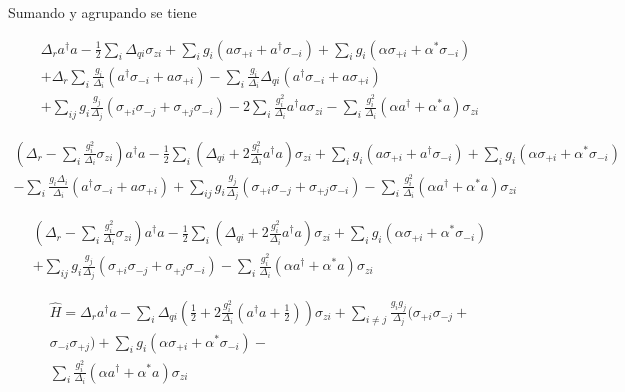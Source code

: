 Sumando y agrupando se tiene

\begin{multline}
\Delta_r a^\dagger a - \frac{1}{2} \sum\limits_i \Delta_{qi} \sigma_{zi} + \sum\limits_i g_i (a \sigma_{+i} + a^\dagger \sigma_{-i}) + \sum\limits_i g_i (\alpha \sigma_{+i} + \alpha^* \sigma_{-i}) \\
+ \Delta_r \sum\limits_i \frac{g_i} {\Delta_i} (a^\dagger \sigma_{-i} + a \sigma_{+i}) - \sum\limits_i \frac{g_i} {\Delta_i} \Delta_{qi} (a^\dagger \sigma_{-i} + a \sigma_{+i}) \\
+ \sum\limits_{ij} g_i \frac{g_j}{\Delta_j} \left(\sigma_{+i} \sigma_{-j} + \sigma_{+j} \sigma_{-i}\right) - 2 \sum\limits_{i} \frac{g_i^2}{\Delta_i} a^\dagger a \sigma_{zi} - \sum\limits_i \frac{g_i^2} {\Delta_i} (\alpha a^\dagger + \alpha^* a) \sigma_{zi}
\end{multline}


\begin{multline}
    (\Delta_r - \sum\limits_i \frac{g_i^2}{\Delta_i} \sigma_{zi}) a^\dagger a - \frac{1}{2} \sum\limits_i (\Delta_{qi} + 2 \frac{g_i^2}{\Delta_i} a^\dagger a) \sigma_{zi} + \sum\limits_i g_i (a \sigma_{+i} + a^\dagger \sigma_{-i}) + \sum\limits_i g_i (\alpha \sigma_{+i} + \alpha^* \sigma_{-i}) \\
- \sum\limits_i \frac{g_i \Delta_i} {\Delta_i} (a^\dagger \sigma_{-i} + a \sigma_{+i}) + \sum\limits_{ij} g_i \frac{g_j}{\Delta_j} \left(\sigma_{+i} \sigma_{-j} + \sigma_{+j} \sigma_{-i}\right) - \sum\limits_i \frac{g_i^2}{\Delta_i} (\alpha a^\dagger + \alpha^* a) \sigma_{zi}
\end{multline}


\begin{multline}
    (\Delta_r - \sum\limits_i \frac{g_i^2}{\Delta_i} \sigma_{zi}) a^\dagger a - \frac{1}{2} \sum\limits_i (\Delta_{qi} + 2 \frac{g_i^2}{\Delta_i} a^\dagger a) \sigma_{zi} + \sum\limits_i g_i (\alpha \sigma_{+i} + \alpha^* \sigma_{-i}) \\
+ \sum\limits_{ij} g_i \frac{g_j}{\Delta_j} \left(\sigma_{+i} \sigma_{-j} + \sigma_{+j} \sigma_{-i}\right) - \sum\limits_i \frac{g_i^2}{\Delta_i} (\alpha a^\dagger + \alpha^* a) \sigma_{zi}
\end{multline}




\begin{multline}
\hat{H} = \Delta_r a^\dagger a - \sum\limits_i \Delta_{qi} (\frac{1}{2} + 2 \frac{g_i^2} {\Delta_i} (a^\dagger a + \frac{1}{2})) \sigma_{zi} +
\sum\limits_{i \neq j} \frac{g_i g_j} {\Delta_j} (\sigma_{+i} \sigma_{-j} +\\
\sigma_{-i} \sigma_{+j}) +
\sum\limits_i g_i (\alpha \sigma_{+i} + \alpha^* \sigma_{-i}) -\\
\sum\limits_i \frac{g_i^2} {\Delta_i} (\alpha a^\dagger + \alpha^* a) \sigma_{zi}
\end{multline}

